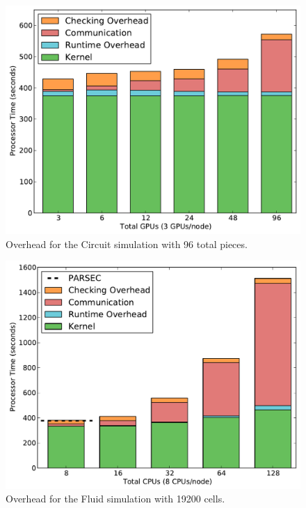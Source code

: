 \begin{figure}
\begin{center}
\includegraphics[scale=0.33]{figs/circuit_96_popl.pdf}
\end{center}
\vspace{-2mm}
\caption{Overhead for the Circuit simulation with 96 total pieces.\label{fig:ckt_overhead}}
\vspace{-6mm}
\end{figure}

\begin{figure}
\begin{center}
\includegraphics[scale=0.33]{figs/fluid_19200_popl.pdf}
\end{center}
\vspace{-2mm}
\caption{Overhead for the Fluid simulation with 19200 cells.\label{fig:fluid_overhead}}
\vspace{-6mm}
\end{figure}

